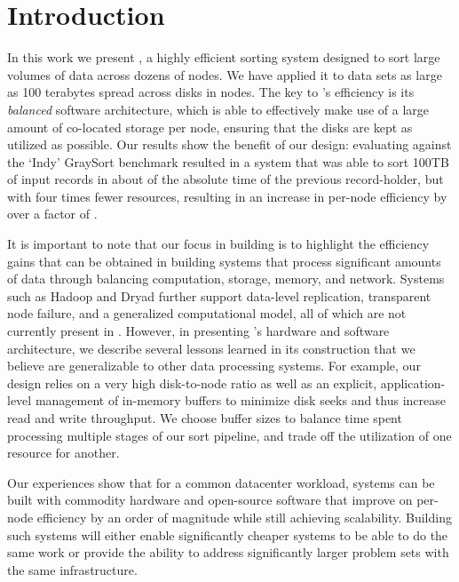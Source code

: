\section{Introduction}
\label{sec:intro}

In this work we present \tritonsort, a highly efficient sorting system designed
to sort large volumes of data across dozens of nodes. We have applied it to
data sets as large as 100 terabytes spread across \tsdisks disks in \tsnodes
nodes.  The key to \tritonsort's efficiency is its \textit{balanced} software
architecture, which is able to effectively make use of a large amount of
co-located storage per node, ensuring that the disks are kept as utilized as
possible.  Our results show the benefit of our design: evaluating \tritonsort
against the `Indy' GraySort benchmark\cite{terasort} resulted in a system that
was able to sort 100TB of input records in about \tspercent of the absolute time
of the previous record-holder, but with four times fewer resources, resulting
in an increase in per-node efficiency by over a factor of \tsimprovementfactor.

It is important to note that our focus in building \tritonsort is to highlight
the efficiency gains that can be obtained in building systems that process
significant amounts of data through balancing computation, storage, memory, and
network.  Systems such as Hadoop and Dryad further support data-level
replication, transparent node failure, and a generalized computational model,
all of which are not currently present in \tritonsort.  However, in presenting
\tritonsort's hardware and software architecture, we describe several lessons
learned in its construction that we believe are generalizable to other data
processing systems.  For example, our design relies on a very high disk-to-node
ratio as well as an explicit, application-level management of in-memory buffers
to minimize disk seeks and thus increase read and write throughput.  We choose
buffer sizes to balance time spent processing multiple stages of our sort
pipeline, and trade off the utilization of one resource for another.

Our experiences show that for a common datacenter workload, systems can be
built with commodity hardware and open-source software that improve on per-node
efficiency by an order of magnitude while still achieving scalability.
Building such systems will either enable significantly cheaper systems to be
able to do the same work or provide the ability to address significantly larger
problem sets with the same infrastructure.

